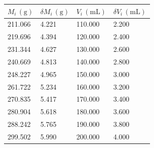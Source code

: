 \begin{tabular}{llll}
\toprule
$M_i\,(\mathrm{g})$ & $\delta M_i\,(\mathrm{g})$ & $V_i\,(\mathrm{mL})$ & $\delta V_i\,(\mathrm{mL})$ \\
\midrule
211.066 & 4.221 & 110.000 & 2.200 \\
219.696 & 4.394 & 120.000 & 2.400 \\
231.344 & 4.627 & 130.000 & 2.600 \\
240.669 & 4.813 & 140.000 & 2.800 \\
248.227 & 4.965 & 150.000 & 3.000 \\
261.722 & 5.234 & 160.000 & 3.200 \\
270.835 & 5.417 & 170.000 & 3.400 \\
280.904 & 5.618 & 180.000 & 3.600 \\
288.242 & 5.765 & 190.000 & 3.800 \\
299.502 & 5.990 & 200.000 & 4.000 \\
\bottomrule
\end{tabular}

